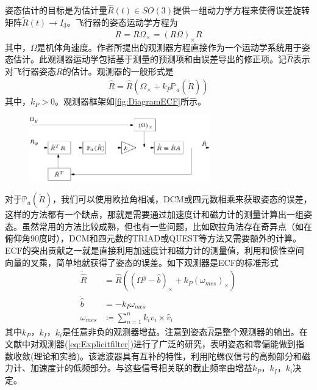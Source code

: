 \documentclass[
  type=master
]{gdutthesis}
\begin{document}
姿态估计的目标是为估计量$\hat{R}(t)\in SO(3)$提供一组动力学方程来使得误差旋转矩阵$\widetilde{R}(t)\rightarrow I_3$。飞行器的姿态运动学方程为
\begin{equation}\label{eq:kinematics}
	\dot{R}=R\Omega_{\times}=(R\Omega)_{\times}R
\end{equation}
其中，$\Omega$是机体角速度。作者所提出的观测器方程直接作为一个运动学系统用于姿态估计。此观测器运动学包括基于测量的预测项和由误差导出的修正项。记$\hat{R}$表示对飞行器姿态$R$的估计。观测器的一般形式是
\begin{equation}\label{eq:passivefilter}
	\dot{\hat{R}}=\hat{R}(\Omega_{\times}+k_P \mathbb{P}_a(\widetilde{R}))
\end{equation}
其中，$k_P>0$。观测器框架如\autoref{fig:DiagramECF}所示。
\begin{figure}[htbp]
	\centering
	\includegraphics[width=0.7\textwidth]{Block-diagram-of-the-simplified-form-of-the-passive-complementary-filter.png}
	\label{fig:DiagramECF}
\end{figure}
对于$\mathbb{P}_a(\widetilde{R})$，我们可以使用欧拉角相减，DCM或四元数相乘来获取姿态的误差，这样的方法都有一个缺点，那就是需要通过加速度计和磁力计的测量计算出一组姿态。虽然常用的方法比较成熟，但也有一些问题，比如欧拉角法存在奇异点（如在俯仰角90度时），DCM和四元数的TRIAD或QUEST等方法又需要额外的计算。ECF的突出贡献之一就是直接利用加速度计和磁力计的测量值，利用和惯性空间向量的叉乘，简单地就获得了姿态的误差。如下观测器是ECF的标准形式
\begin{equation}\label{eq:Explicitfilter}
	\begin{aligned}
	\dot{\hat{R}}&=\hat{R}((\Omega^y - \hat{b})_{\times}+k_P (\omega_{mes})_{\times})\\
	\dot{\hat{b}}&=-k_I \omega_{mes}\\
	\omega_{mes} &\coloneqq \sum_{n=1}^{n} k_i v_i \times \hat{v}_i	
	\end{aligned}
\end{equation}
其中$k_P$，$k_I$，$k_i$是任意非负的观测器增益。注意到姿态$\hat{R}$是整个观测器的输出。在文献\cite{mahony2008nonlinear}中对观测器(\autoref{eq:Explicitfilter})进行了广泛的研究，表明姿态和零偏能做到指数收敛(理论和实验)。该滤波器具有互补的特性，利用陀螺仪信号的高频部分和磁力计、加速度计的低频部分\cite{mahony2008nonlinear}。与这些信号相关联的截止频率由增益$k_P$，$k_I$，$k_i$决定。
\end{document}
